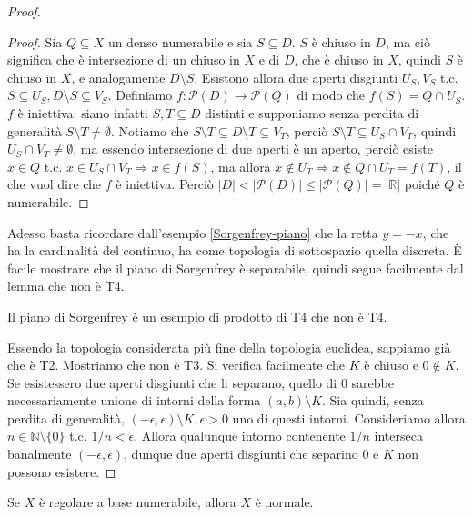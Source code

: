 \begin{proof}
\begin{proof}
    Sia $Q \subseteq X$ un denso numerabile e sia $S \subseteq D$. $S$ è chiuso in $D$, ma ciò significa che è intersezione di un chiuso in $X$ e di $D$, che è chiuso in $X$, quindi $S$ è chiuso in $X$, e analogamente $D \setminus S$. Esistono allora due aperti disgiunti $U_S, V_S$ t.c. $S \subseteq U_S, D \setminus S \subseteq V_S$. Definiamo $f: \mathcal{P}(D) \rightarrow \mathcal{P}(Q)$ di modo che $f(S)=Q \cap U_S$. $f$ è iniettiva:
    siano infatti $S, T \subseteq D$ distinti e supponiamo senza perdita di generalità $S \setminus T \not= \emptyset$. Notiamo che $S \setminus T \subseteq D \setminus T \subseteq V_T$, perciò $S \setminus T \subseteq U_S \cap V_T$, quindi $U_S \cap V_T \not= \emptyset$, ma essendo intersezione di
    due aperti è un aperto, perciò esiste $x \in Q$ t.c. $x \in U_S \cap V_T \Rightarrow x \in f(S)$, ma allora $x \not\in U_T \Rightarrow x \not\in Q \cap U_T =f(T)$, il che vuol dire che $f$ è iniettiva. Perciò $|D| < |\mathcal{P}(D)| \le |\mathcal{P}(Q)|=|\mathbb{R}|$ poiché $Q$ è numerabile.
  \end{proof}
  Adesso basta ricordare dall'esempio \ref{Sorgenfrey-piano} che la retta $y=-x$, che ha la cardinalità del continuo, ha come topologia di sottospazio quella discreta. È facile mostrare che il piano di Sorgenfrey è separabile, quindi segue facilmente dal lemma che non è T4.
  \begin{oss}
    Il piano di Sorgenfrey è un esempio di prodotto di T4 che non è T4.
  \end{oss}
  \item Essendo la topologia considerata più fine della topologia euclidea, sappiamo già che è T2. Mostriamo che non è T3. Si verifica facilmente che $K$ è chiuso e $0 \not\in K$. Se esistessero due aperti disgiunti che li separano, quello di $0$ sarebbe necessariamente unione di intorni della forma $(a, b) \setminus K$. Sia quindi, senza perdita di generalità, $(-\epsilon, \epsilon) \setminus K, \epsilon>0$ uno di questi intorni. Consideriamo allora $n \in \mathbb{N} \setminus \{0\}$ t.c. $1/n < \epsilon$. Allora qualunque intorno contenente $1/n$ interseca banalmente $(-\epsilon, \epsilon)$, dunque due aperti disgiunti che separino $0$ e $K$ non possono esistere.
\end{proof}

\begin{thm}
  Se $X$ è regolare a base numerabile, allora $X$ è normale.
\end{thm}

